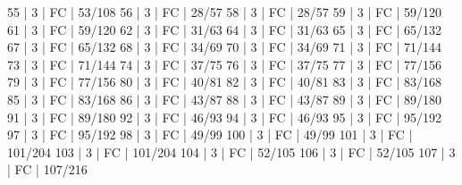 55    |  3     |    FC                                        | 53/108   
56    |  3     |    FC                                        | 28/57   
58    |  3     |    FC                                        | 28/57   
59    |  3     |    FC                                        | 59/120   
61    |  3     |    FC                                        | 59/120   
62    |  3     |    FC                                        | 31/63   
64    |  3     |    FC                                        | 31/63   
65    |  3     |    FC                                        | 65/132   
67    |  3     |    FC                                        | 65/132   
68    |  3     |    FC                                        | 34/69   
70    |  3     |    FC                                        | 34/69   
71    |  3     |    FC                                        | 71/144   
73    |  3     |    FC                                        | 71/144   
74    |  3     |    FC                                        | 37/75   
76    |  3     |    FC                                        | 37/75   
77    |  3     |    FC                                        | 77/156   
79    |  3     |    FC                                        | 77/156   
80    |  3     |    FC                                        | 40/81   
82    |  3     |    FC                                        | 40/81   
83    |  3     |    FC                                        | 83/168   
85    |  3     |    FC                                        | 83/168   
86    |  3     |    FC                                        | 43/87   
88    |  3     |    FC                                        | 43/87   
89    |  3     |    FC                                        | 89/180   
91    |  3     |    FC                                        | 89/180   
92    |  3     |    FC                                        | 46/93   
94    |  3     |    FC                                        | 46/93   
95    |  3     |    FC                                        | 95/192   
97    |  3     |    FC                                        | 95/192   
98    |  3     |    FC                                        | 49/99   
100   |  3     |    FC                                        | 49/99   
101   |  3     |    FC                                        | 101/204   
103   |  3     |    FC                                        | 101/204   
104   |  3     |    FC                                        | 52/105   
106   |  3     |    FC                                        | 52/105   
107   |  3     |    FC                                        | 107/216   
